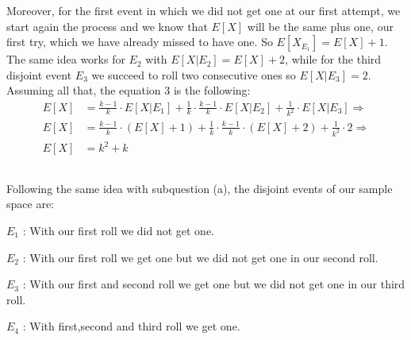 \documentclass[11pt]{537homework}
\begin{document}
\endgroup
Moreover, for the first event in which we did not get one at our first attempt, we start again the process and we know that $E[X]$ will be the same plus one, our first try, which we have already missed to have one. So $E[X_E_1] = E[X]+1$. The same idea works for $E_2$ with $E[X|E_2] = E[X]+2$, while for the third disjoint event $E_3$ we succeed to roll two consecutive ones so $E[X|E_3] = 2$. Assuming all that, the equation 3 is the following:
\begingroup
\allowdisplaybreaks
\begin{align*}
 E[X] &= \frac{k-1}{k} \cdot E[X|E_1] + \frac{1}{k} \cdot \frac{k-1}{k} \cdot E[X|E_2] + \frac{1}{k^2} \cdot E[X|E_3] \Longrightarrow \\
  E[X] &= \frac{k-1}{k} \cdot (E[X]+1) + \frac{1}{k} \cdot \frac{k-1}{k} \cdot (E[X]+2) + \frac{1}{k^2} \cdot 2 \Longrightarrow \\
   E[X] &= k^2 +k 
\end{align*}
\endgroup
\subsection{}
Following the same idea with subquestion (a), the disjoint events of our sample space are:
\begin{description}[font=$\bullet$]
\item $E_1$ : With our first roll we did not get one.
\item $E_2$ : With our first roll we get one but we did not get one in our second roll.
\item $E_3$ : With our first and second roll we get one but we did not get one in our third roll.
\item $E_4$ : With first,second and third roll we get one.
\end{description}
\end{document}
